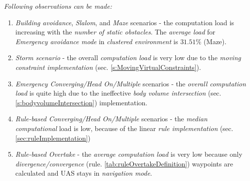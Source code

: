 \noindent \emph{Following observations can be made:}

\begin{enumerate}
    \item \emph{Building avoidance}, \emph{Slalom}, and \emph{Maze} scenarios - the computation load is increasing with the \emph{number of static obstacles}. The \emph{average load} for \emph{Emergency avoidance mode} in \emph{clustered environment} is $31.51\%$ (Maze).
    
    \item \emph{Storm scenario} - the overall \emph{computation load} is very low due to the \emph{moving constraint implementation} (sec. \ref{s:MovingVirtualConstraints}).
    
    \item\emph{Emergency Converging/Head On/Multiple} scenarios - the \emph{overall computation load} is quite high due to the ineffective \emph{body volume intersection} (sec. \ref{s:bodyvolumeIntersection}) implementation.
    
    \item \emph{Rule-based Converging/Head On/Multiple} scenarios - the \emph{median computational} load is low, because of the linear \emph{rule implementation} (sec. \ref{sec:ruleImplementation})
    
    \item \emph{Rule-based Overtake} - the \emph{average computation load} is very low because only \emph{divergence/convergence} (rule. \ref{tab:ruleOvertakeDefinition}) waypoints are calculated and UAS stays in \emph{navigation mode}.
\end{enumerate}
